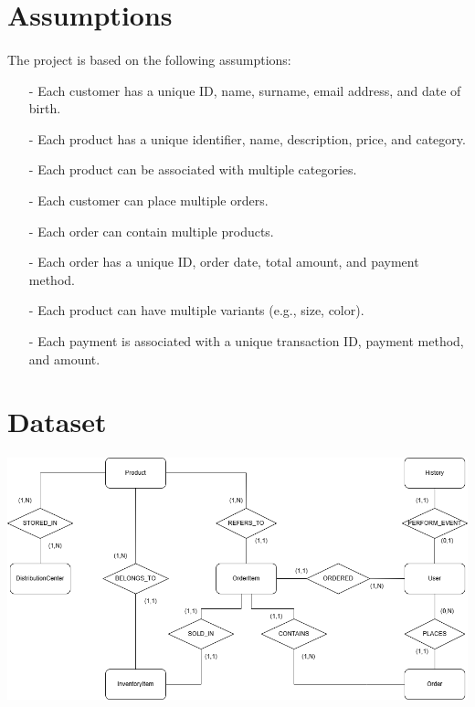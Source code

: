 \documentclass[a4paper,12pt]{article}
\begin{document}
\newpage
\section{Assumptions}
\paragraph{} The project is based on the following assumptions:
\begin{itemize}[noitemsep]
   \item[-] Each customer has a unique ID, name, surname, email address, and date of birth.
   \item[-] Each product has a unique identifier, name, description, price, and category.
   \item[-] Each product can be associated with multiple categories.
   \item[-] Each customer can place multiple orders.
   \item[-] Each order can contain multiple products.
   \item[-] Each order has a unique ID, order date, total amount, and payment method.
   \item[-] Each product can have multiple variants (e.g., size, color).
   \item[-] Each payment is associated with a unique transaction ID, payment method, and amount.
\end{itemize}

\clearpage
\section{Dataset}
\paragraph{}
	\begin{center}
 		\includegraphics[width = 12 cm]{PhotoProjectDiagram.png}
	\end{center}
\end{document}
